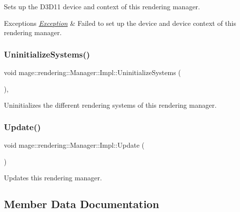 Sets up the D3\+D11 device and context of this rendering manager.


\begin{DoxyExceptions}{Exceptions}
{\em \hyperlink{classmage_1_1_exception}{Exception}} & Failed to set up the device and device context of this rendering manager. \\
\hline
\end{DoxyExceptions}
\hypertarget{classmage_1_1rendering_1_1_manager_1_1_impl_a0e2979e4330a5148da2fa6cabd19078f}{}\label{classmage_1_1rendering_1_1_manager_1_1_impl_a0e2979e4330a5148da2fa6cabd19078f} 
\subsubsection{\texorpdfstring{Uninitialize\+Systems()}{UninitializeSystems()}}
{\footnotesize\ttfamily void mage\+::rendering\+::\+Manager\+::\+Impl\+::\+Uninitialize\+Systems (\begin{DoxyParamCaption}{ }\end{DoxyParamCaption})\hspace{0.3cm}{\ttfamily [private]}, {\ttfamily [noexcept]}}

Uninitializes the different rendering systems of this rendering manager. \hypertarget{classmage_1_1rendering_1_1_manager_1_1_impl_a8fd123eb4cc188a207ca0bb9824c3f59}{}\label{classmage_1_1rendering_1_1_manager_1_1_impl_a8fd123eb4cc188a207ca0bb9824c3f59} 
\subsubsection{\texorpdfstring{Update()}{Update()}}
{\footnotesize\ttfamily void mage\+::rendering\+::\+Manager\+::\+Impl\+::\+Update (\begin{DoxyParamCaption}{ }\end{DoxyParamCaption})}

Updates this rendering manager. 

\subsection{Member Data Documentation}
\hypertarget{classmage_1_1rendering_1_1_manager_1_1_impl_aa53fc50439eb2fefbc770440f65eae8a}{}\label{classmage_1_1rendering_1_1_manager_1_1_impl_aa53fc50439eb2fefbc770440f65eae8a} 
